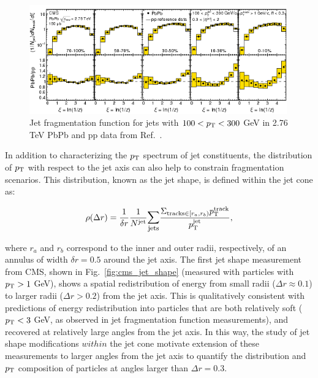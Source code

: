 \begin{figure}[h!]
\begin{center}
\includegraphics[width=0.99\textwidth]{figures/Theory/CMS_JFF.png}
\caption[Jet fragmentation function in 2.76 TeV PbPb and pp data]{Jet fragmentation function for jets with $100 < p_{\rm T} < 300$ GeV in 2.76 TeV PbPb and pp data from Ref.~\cite{CMS:2012vba}.}
\label{fig:cms_jff}
\end{center}
\end{figure}

In addition to characterizing the $p_{\rm T}$ spectrum of jet constituents, the distribution of $p_{\rm T}$ with respect to the jet axis can also help to constrain fragmentation scenarios.  This distribution, known as the jet shape, is defined within the jet cone as: 

\begin{equation}
\label{eq:jet_shape_cms}
\rho(\Delta r) = \frac{1}{\delta r}\frac{1}{N^{\rm jet}} \mathlarger{ \sum \limits_{\rm jets}} \frac{\Sigma_{{\rm tracks}\in[r_{a},r_{b})} p_{\rm T}^{\rm track}}{p_{\rm T}^{\rm jet}},
\end{equation}

\noindent where $r_{a}$ and $r_{b}$ correspond to the inner and outer radii, respectively, of an annulus of width $\delta r = 0.5$ around the jet axis.  The first jet shape measurement from CMS, shown in Fig.~\ref{fig:cms_jet_shape} (measured with particles with $p_{\rm T} > 1$ GeV), shows a spatial redistribution of energy from small radii ($\Delta r \approx 0.1$) to larger radii ($\Delta r > 0.2$) from the jet axis.  This is qualitatively consistent with predictions of energy redistribution into particles that are both relatively soft ($p_{\rm T} < 3 $ GeV, as observed in jet fragmentation function measurements), and recovered at relatively large angles from the jet axis.  In this way, the study of jet shape modifications $within$ the jet cone motivate extension of these measurements to larger angles from the jet axis to quantify the distribution and $p_{\rm T}$ composition of particles at angles larger than $\Delta r = 0.3$.  

